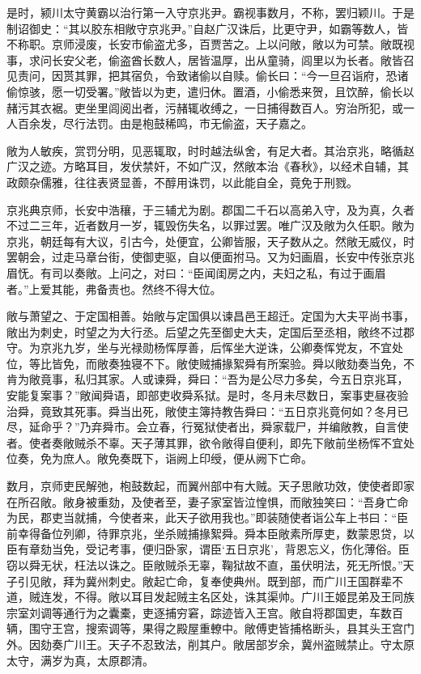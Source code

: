 \documentclass[12pt,UTF8]{ctexbook}
\begin{document}
是时，颍川太守黄霸以治行第一入守京兆尹。霸视事数月，不称，罢归颖川。于是制诏御史：“其以胶东相敞守京兆尹。”自赵广汉诛后，比更守尹，如霸等数人，皆不称职。京师浸废，长安市偷盗尤多，百贾苦之。上以问敞，敞以为可禁。敞既视事，求问长安父老，偷盗酋长数人，居皆温厚，出从童骑，闾里以为长者。敞皆召见责问，因贳其罪，把其宿负，令致诸偷以自赎。偷长曰：“今一旦召诣府，恐诸偷惊骇，愿一切受署。”敞皆以为吏，遣归休。置酒，小偷悉来贺，且饮醉，偷长以赭污其衣裾。吏坐里闾阅出者，污赭辄收缚之，一日捕得数百人。穷治所犯，或一人百余发，尽行法罚。由是枹鼓稀鸣，市无偷盗，天子嘉之。



敞为人敏疾，赏罚分明，见恶辄取，时时越法纵舍，有足大者。其治京兆，略循赵广汉之迹。方略耳目，发伏禁奸，不如广汉，然敞本治《春秋》，以经术自辅，其政颇杂儒雅，往往表贤显善，不醇用诛罚，以此能自全，竟免于刑戮。



京兆典京师，长安中浩穰，于三辅尤为剧。郡国二千石以高弟入守，及为真，久者不过二三年，近者数月一岁，辄毁伤失名，以罪过罢。唯广汉及敞为久任职。敞为京兆，朝廷每有大议，引古今，处便宜，公卿皆服，天子数从之。然敞无威仪，时罢朝会，过走马章台街，使御吏驱，自以便面拊马。又为妇画眉，长安中传张京兆眉怃。有司以奏敞。上问之，对曰：“臣闻闺房之内，夫妇之私，有过于画眉者。”上爱其能，弗备责也。然终不得大位。



敞与萧望之、于定国相善。始敞与定国俱以谏昌邑王超迁。定国为大夫平尚书事，敞出为刺史，时望之为大行丞。后望之先至御史大夫，定国后至丞相，敞终不过郡守。为京兆九岁，坐与光禄勋杨恽厚善，后恽坐大逆诛，公卿奏恽党友，不宜处位，等比皆免，而敞奏独寝不下。敞使贼捕掾絮舜有所案验。舜以敞劾奏当免，不肯为敞竟事，私归其家。人或谏舜，舜曰：“吾为是公尽力多矣，今五日京兆耳，安能复案事？”敞闻舜语，即部吏收舜系狱。是时，冬月未尽数日，案事吏昼夜验治舜，竟致其死事。舜当出死，敞使主簿持教告舜曰：“五日京兆竟何如？冬月已尽，延命乎？”乃弃舜市。会立春，行冤狱使者出，舜家载尸，并编敞教，自言使者。使者奏敞贼杀不辜。天子薄其罪，欲令敞得自便利，即先下敞前坐杨恽不宜处位奏，免为庶人。敞免奏既下，诣阙上印绶，便从阙下亡命。



数月，京师吏民解弛，枹鼓数起，而翼州部中有大贼。天子思敞功效，使使者即家在所召敞。敞身被重劾，及使者至，妻子家室皆泣惶惧，而敞独笑曰：“吾身亡命为民，郡吏当就捕，今使者来，此天子欲用我也。”即装随使者诣公车上书曰：“臣前幸得备位列卿，待罪京兆，坐杀贼捕掾絮舜。舜本臣敞素所厚吏，数蒙恩贷，以臣有章劾当免，受记考事，便归卧家，谓臣‘五日京兆’，背恩忘义，伤化薄俗。臣窃以舜无状，枉法以诛之。臣敞贼杀无辜，鞠狱故不直，虽伏明法，死无所恨。”天子引见敞，拜为冀州刺史。敞起亡命，复奉使典州。既到部，而广川王国群辈不道，贼连发，不得。敞以耳目发起贼主名区处，诛其渠帅。广川王姬昆弟及王同族宗室刘调等通行为之囊橐，吏逐捕穷窘，踪迹皆入王宫。敞自将郡国吏，车数百辆，围守王宫，搜索调等，果得之殿屋重轑中。敞傅吏皆捕格断头，县其头王宫门外。因劾奏广川王。天子不忍致法，削其户。敞居部岁余，冀州盗贼禁止。守太原太守，满岁为真，太原郡清。
\end{document}
